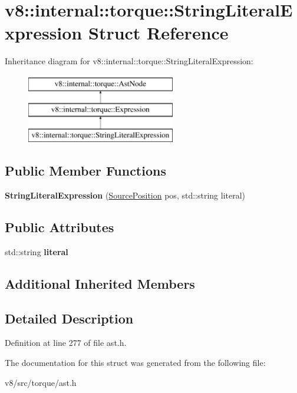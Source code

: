 \hypertarget{structv8_1_1internal_1_1torque_1_1StringLiteralExpression}{}\section{v8\+:\+:internal\+:\+:torque\+:\+:String\+Literal\+Expression Struct Reference}
\label{structv8_1_1internal_1_1torque_1_1StringLiteralExpression}
Inheritance diagram for v8\+:\+:internal\+:\+:torque\+:\+:String\+Literal\+Expression\+:\begin{figure}[H]
\begin{center}
\leavevmode
\includegraphics[height=3.000000cm]{structv8_1_1internal_1_1torque_1_1StringLiteralExpression}
\end{center}
\end{figure}
\subsection*{Public Member Functions}
\begin{DoxyCompactItemize}
\item 
\mbox{\label{structv8_1_1internal_1_1torque_1_1StringLiteralExpression_a57ec790c0b0cf5975fd7bc4c9cda2384}} 
{\bfseries String\+Literal\+Expression} (\mbox{\hyperlink{structv8_1_1internal_1_1torque_1_1SourcePosition}{Source\+Position}} pos, std\+::string literal)
\end{DoxyCompactItemize}
\subsection*{Public Attributes}
\begin{DoxyCompactItemize}
\item 
\mbox{\label{structv8_1_1internal_1_1torque_1_1StringLiteralExpression_a4b79f4d7dd83cae4b663cbe0506f7c69}} 
std\+::string {\bfseries literal}
\end{DoxyCompactItemize}
\subsection*{Additional Inherited Members}


\subsection{Detailed Description}


Definition at line 277 of file ast.\+h.



The documentation for this struct was generated from the following file\+:\begin{DoxyCompactItemize}
\item 
v8/src/torque/ast.\+h\end{DoxyCompactItemize}
